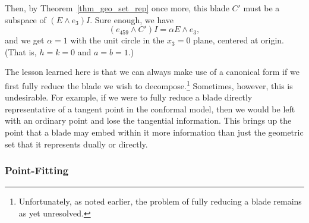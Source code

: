 \documentclass{birkjour}
\theoremstyle{definition}
\theoremstyle{remark}
\numberwithin{equation}{section}
\begin{document}
Then, by Theorem~\ref{thm_geo_set_rep} once more, this blade $C'$ must be a subspace
of $(E\wedge e_3)I$.  Sure enough, we have
\begin{equation}
(e_{459}\wedge C')I = \alpha E\wedge e_3,
\end{equation}
and we get $\alpha=1$ with the unit circle in the $x_3=0$ plane, centered at origin.
(That is, $h=k=0$ and $a=b=1$.)

The lesson learned here is that we can always make use of a canonical form if we first
fully reduce the blade we wish to decompose.\footnote{Unfortunately, as noted
earlier, the problem of fully reducing a blade remains as yet unresolved.}  Sometimes, however, this is undesirable.
For example, if we were to fully reduce a blade directly representative of a tangent
point in the conformal model, then we would be left with an ordinary point and lose the tangential information.
This brings up the point that a blade may embed within it more information than just the geometric
set that it represents dually or directly.

\subsubsection{Point-Fitting}
\end{document}
